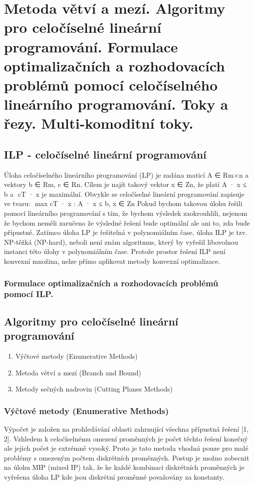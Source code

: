 \section[KO - ILP, toky]{Metoda větví a mezí. Algoritmy pro celočíselné lineární programování. Formulace optimalizačních a rozhodovacích problémů pomocí celočíselného lineárního programování. Toky a řezy. Multi-komoditní toky.}


\subsection*{ILP - celočíselné lineární programování}
Úloha celočíselného lineárního programování (LP) je zadána maticí A ∈ Rm×n a vektory b ∈ Rm, c ∈ Rn. Cílem je najít takový vektor x ∈ Zn, že platí A · x ≤ b a  cT · x je maximální.
Obvykle se celočíselné lineární programování zapisuje ve tvaru:  max { cT · x : A · x ≤ b, x ∈ Zn }	
Pokud bychom takovou úlohu řešili pomocí lineárního programování s tím, že bychom výsledek zaokrouhlili, nejenom že bychom neměli zaručeno že výsledné řešení bude optimální ale ani to, zda bude přípustné. 
Zatímco úloha LP je řešitelná v polynomiálním čase, úloha ILP je tzv. NP-těžká (NP-hard), neboli není znám algoritmus, který by vyřešil libovolnou instanci této úlohy v polynomiálním čase. Protože prostor řešení ILP není konvexní množina, nelze přímo aplikovat metody konvexní optimalizace.

\subsubsection*{Formulace optimalizačních a rozhodovacích problémů pomocí ILP.}

\subsection*{Algoritmy pro celočíselné lineární programování}
\begin{enumerate}
	\item Výčtové metody (Enumerative Methods)
	\item Metoda větví a mezí (Branch and Bound)
	\item Metody sečných nadrovin (Cutting Planes Methods)
\end{enumerate}

\subsubsection*{Výčtové metody (Enumerative Methods)}
Výpočet je založen na prohledávání oblasti zahrnující všechna přípustná řešení [1, 2]. Vzhledem k celočíselnému omezení proměnných je počet těchto řešení konečný ale jejich počet je extrémně vysoký. Proto je tato metoda vhodná pouze pro malé problémy s omezeným počtem diskrétních proměnných. Postup je možno zobecnit na úlohu MIP (mixed IP) tak, že ke každé kombinaci diskrétních proměnných je vyřešena úloha LP kde jsou diskrétní proměnné považovány za konstanty. \cite{ko:ilp-sucha}

